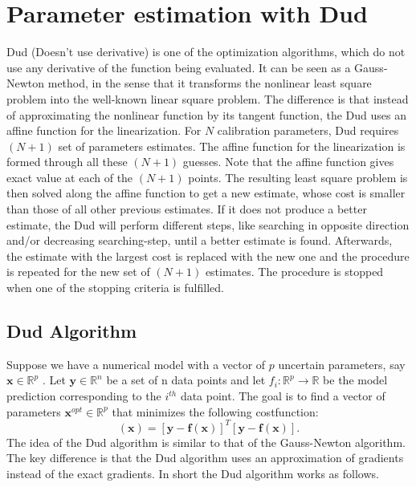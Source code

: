 \section{Parameter estimation with Dud}

Dud (Doesn't use derivative) is one of the optimization algorithms, which do
not use any derivative of the function being evaluated. It can be seen as a
Gauss-Newton method, in the sense that it transforms the nonlinear least square
problem into the well-known linear square problem. The difference is that
instead of approximating the nonlinear function by its tangent function, the
Dud uses an affine function for the linearization. For $N$ calibration
parameters, Dud requires $(N+1)$ set of parameters estimates. The affine
function for the linearization is formed through all these $(N+1)$ guesses.
Note that the affine function gives exact value at each of the $(N+1)$ points.
The resulting least square problem is then solved along the affine function to
get a new estimate, whose cost is smaller than those of all other previous
estimates. If it does not produce a better estimate, the Dud will perform
different steps, like searching in opposite direction and/or decreasing
searching-step, until a better estimate is found. Afterwards, the estimate with
the largest cost is replaced with the new one and the procedure is repeated for
the new set of $(N+1)$ estimates. The procedure is stopped when one of the
stopping criteria is fulfilled.

\subsection{Dud Algorithm}

Suppose we have a numerical model with a vector of $p$ uncertain parameters,
say $\mathbf{x} \in \mathbb{R}^p$ . Let $\mathbf{y} \in \mathbb{R}^n$ be a set
of n data points and let $f_i : \mathbb{R}^p \rightarrow \mathbb{R}$ be the
model prediction corresponding to the $i^{th}$ data point. The goal is to find
a vector of parameters $\mathbf{x}^{opt} \in \mathbb{R}^p$ that minimizes the
following costfunction:
\begin{equation}\label{eq:dudcost}
(\mathbf{x}) = [\mathbf{y} - \mathbf{f(x)}]^T [\mathbf{y} - \mathbf{f(x)}].
\end{equation}
The idea of the Dud algorithm is similar to that of the Gauss-Newton algorithm.
The key difference is that the Dud algorithm uses an approximation of gradients
instead of the exact gradients. In short the Dud algorithm works as follows.

